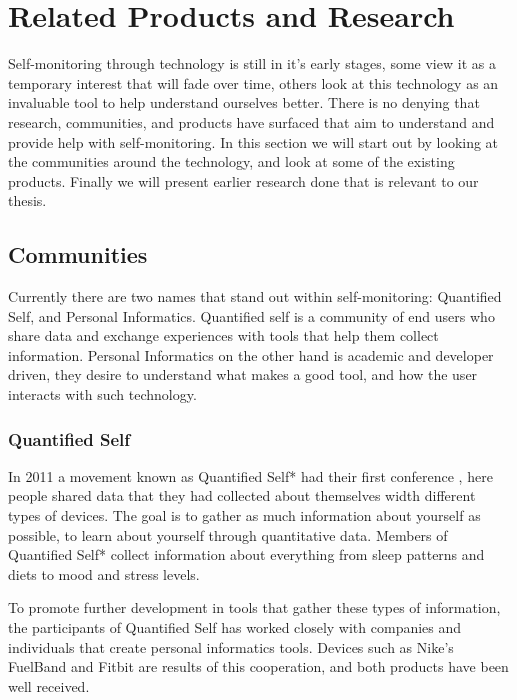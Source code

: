\chapter{Related Products and Research} %

\label{Chapter3} %

Self-monitoring through technology is still in it's early stages, some view it as a temporary interest that will fade over time, others look at this technology as an invaluable tool to help understand ourselves better. There is no denying that research, communities, and products have surfaced that aim to understand and provide help with self-monitoring. In this section we will start out by looking at the communities around the technology, and look at some of the existing products. Finally we will present earlier research done that is relevant to our thesis.

\section{Communities}
Currently there are two names that stand out within self-monitoring: Quantified Self, and Personal Informatics. Quantified self is a community of end users who share data and exchange experiences with tools that help them collect information. Personal Informatics on the other hand is academic and developer driven, they desire to understand what makes a good tool, and how the user interacts with such technology.

\subsection{Quantified Self}
In 2011 a movement known as Quantified Self*\cite{quantifiedSelf} had their first conference \cite{bodyHackers}, here people shared data that they had collected about themselves width different types of devices. The goal is to gather as much information about yourself as possible, to learn about yourself through quantitative data. Members of Quantified Self* collect information about everything from sleep patterns and diets to mood and stress levels.

To promote further development in tools that gather these types of information, the participants of Quantified Self has worked closely with companies and individuals that create personal informatics tools. Devices such as Nike's FuelBand \cite{fuelBand} and Fitbit \cite{fitBit} are results of this cooperation, and both products have been well received.


